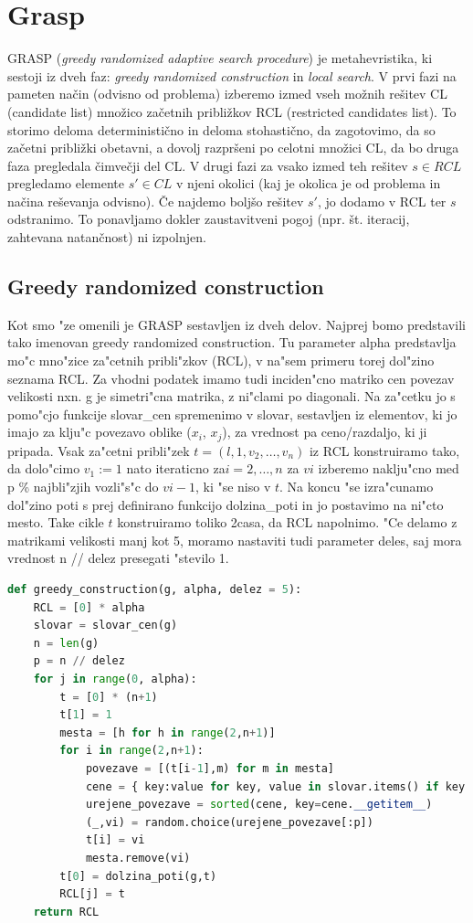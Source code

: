 \documentclass[12pt,a4paper]{amsart}
\theoremstyle{definition} %
\theoremstyle{plain} %
\begin{document}
\section{Grasp} 

GRASP (\textit{greedy randomized adaptive search procedure}) je metahevristika, ki sestoji iz dveh faz: \textit{greedy randomized construction} in \textit{local search}.
V prvi fazi na pameten način (odvisno od problema) izberemo izmed vseh možnih rešitev CL (candidate list) množico začetnih približkov RCL (restricted candidates list). 
To storimo deloma deterministično in deloma stohastično, da zagotovimo, da so začetni približki obetavni, a dovolj razpršeni po celotni množici CL, da bo druga faza pregledala čimvečji del CL. 
V drugi fazi za vsako izmed teh rešitev $ s \in  RCL $ pregledamo elemente $s' \in CL$ v njeni okolici (kaj je okolica je od problema in načina reševanja odvisno). Če najdemo boljšo rešitev $s'$, 
jo dodamo v RCL ter $s$ odstranimo. To ponavljamo dokler zaustavitveni pogoj (npr. št. iteracij, zahtevana natančnost) ni izpolnjen.

\subsection{Greedy randomized construction} 

Kot smo "ze omenili je GRASP sestavljen iz dveh delov. Najprej bomo predstavili tako imenovan greedy randomized construction.
Tu parameter alpha predstavlja mo"c mno"zice za"cetnih pribli"zkov (RCL), v na"sem primeru torej dol"zino seznama RCL.
Za vhodni podatek imamo tudi inciden"cno matriko cen povezav velikosti nxn. g je simetri"cna matrika, z ni"clami po diagonali.
Na za"cetku jo s pomo"cjo funkcije slovar\_cen spremenimo v slovar, sestavljen iz elementov, ki jo imajo za klju"c povezavo oblike ($x_{i}$, $x_{j}$), za vrednost pa ceno/razdaljo, ki ji pripada. Vsak za"cetni pribli"zek $t = (l,1,v_{2}, \dots,v_{n})$ iz RCL konstruiramo tako, da dolo"cimo $v_{1} := 1$ nato iteraticno za$ i = 2, \dots,n$ za $v{i}$ izberemo naklju"cno med p \% najbli"zjih vozli"s"c do $v{i-1}$, ki "se niso v  $t$. Na koncu "se izra"cunamo dol"zino poti s prej definirano funkcijo dolzina\_poti in jo postavimo na ni"cto mesto. Take cikle $t$ konstruiramo toliko 2casa, da RCL napolnimo. "Ce delamo z matrikami velikosti manj kot 5, moramo nastaviti tudi parameter deles, saj mora vrednost n // delez presegati "stevilo 1.  


\begin{lstlisting}[language=Python]
def greedy_construction(g, alpha, delez = 5):
    RCL = [0] * alpha
    slovar = slovar_cen(g)
    n = len(g)
    p = n // delez
    for j in range(0, alpha):
        t = [0] * (n+1)
        t[1] = 1
        mesta = [h for h in range(2,n+1)]
        for i in range(2,n+1):
            povezave = [(t[i-1],m) for m in mesta]
            cene = { key:value for key, value in slovar.items() if key in povezave }
            urejene_povezave = sorted(cene, key=cene.__getitem__)
            (_,vi) = random.choice(urejene_povezave[:p])
            t[i] = vi
            mesta.remove(vi)
        t[0] = dolzina_poti(g,t)
        RCL[j] = t
    return RCL
\end{lstlisting}
\end{document}
